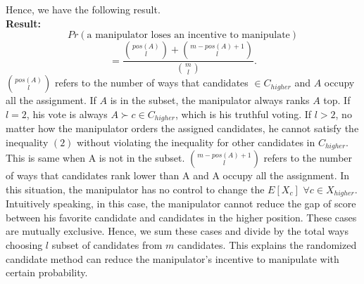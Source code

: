 \documentclass[letterpaper]{article} %
\begin{document}
Hence, we have the following result.\\
\textbf{Result:}
$$Pr(\text{a manipulator loses an incentive to manipulate})$$
\begin{equation}
 = \frac{\binom{pos(A)}{l}+\binom{m-pos(A)+1}{l}}{\binom{m}{l}}.
\end{equation}
$\binom{pos(A)}{l}$ refers to the number of ways that candidates $\in C_{higher}$ and $A$ occupy all the assignment. If $A$ is in the subset, the manipulator always ranks $A$ top. If $l = 2$, his vote is always $A\succ c \in C_{higher}$, which is his truthful voting. If $l>2$, no matter how the manipulator orders the assigned candidates, he cannot satisfy the inequality $(2)$ without violating the inequality for other candidates in $C_{higher}$. This is same when A is not in the subset.
$\binom{m-pos(A)+1}{l}$ refers to the number of ways that candidates rank lower than A and A occupy all the assignment. In this situation, the manipulator has no control to change the $E[X_c]$ $\forall c \in X_{higher}$. Intuitively speaking, in this case, the manipulator cannot reduce the gap of score between his favorite candidate and candidates in the higher position. These cases are mutually exclusive. Hence, we sum these cases and divide by the total ways choosing $l$ subset of candidates from $m$ candidates. This explains the randomized candidate method can reduce the manipulator’s incentive to manipulate with certain probability. 
\end{document}
